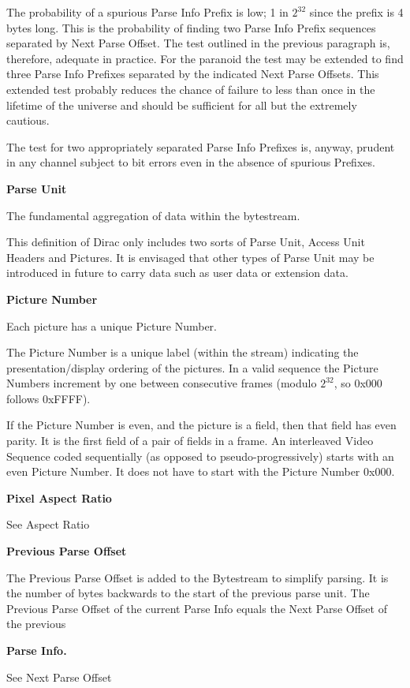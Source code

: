The probability of a spurious Parse Info Prefix is low; 1 in $2^{32}$
since the prefix is 4 bytes long. This is the probability of finding two
Parse Info Prefix sequences separated by Next Parse Offset. The test
outlined in the previous paragraph is, therefore, adequate in practice.
For the paranoid the test may be extended to find three Parse Info
Prefixes separated by the indicated Next Parse Offsets. This extended
test probably reduces the chance of failure to less than once in the
lifetime of the universe and should be sufficient for all but the
extremely cautious.

The test for two appropriately separated Parse Info Prefixes is, anyway,
prudent in any channel subject to bit errors even in the absence of
spurious Prefixes.

\textbf{Parse Unit}

The fundamental aggregation of data within the bytestream.

This definition of Dirac only includes two sorts of Parse Unit, Access
Unit Headers and Pictures. It is envisaged that other types of Parse
Unit may be introduced in future to carry data such as user data or
extension data.

\textbf{Picture Number}

Each picture has a unique Picture Number.

The Picture Number is a unique label (within the stream) indicating the
presentation/display ordering of the pictures. In a valid sequence the
Picture Numbers increment by one between consecutive frames (modulo
$2^{32}$, so 0x000 follows 0xFFFF).

If the Picture Number is even, and the picture is a field, then that
field has even parity. It is the first field of a pair of fields in a
frame. An interleaved Video Sequence coded sequentially (as opposed to
pseudo-progressively) starts with an even Picture Number. It does not
have to start with the Picture Number 0x000.

\textbf{Pixel Aspect Ratio}

See Aspect Ratio

\textbf{Previous Parse Offset}

The Previous Parse Offset is added to the Bytestream to simplify
parsing. It is the number of bytes backwards to the start of the
previous parse unit. The Previous Parse Offset of the current Parse Info
equals the Next Parse Offset of the previous

\textbf{Parse Info.}

See Next Parse Offset

